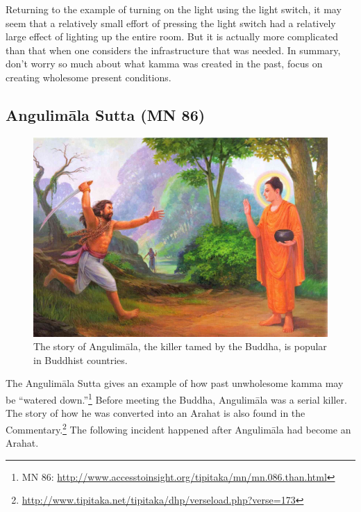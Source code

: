 Returning to the example of turning on the light using the light switch, it may seem that a relatively small effort of pressing the light switch had a relatively large effect of lighting up the entire room. But it is actually more complicated than that when one considers the infrastructure that was needed. In summary, don’t worry so much about what kamma was created in the past, focus on creating wholesome present conditions.


\subsection*{Angulimāla Sutta (MN 86)}

\begin{figure}[h]
\centering
\includegraphics[width=0.8\linewidth]{./Diagrams/angulimala}
\caption{The story of Angulimāla, the killer tamed by the Buddha, is popular in Buddhist countries.}
\label{fig:angulimala}
\end{figure}

The Angulimāla Sutta gives an example of how past unwholesome kamma may be “watered down.”\footnote{MN 86: \url{http://www.accesstoinsight.org/tipitaka/mn/mn.086.than.html}} Before meeting the Buddha, Angulimāla was a serial killer. The story of how he was converted into an Arahat is also found in the Commentary.\footnote{\url{http://www.tipitaka.net/tipitaka/dhp/verseload.php?verse=173}} The following incident happened after Angulimāla had become an Arahat.

